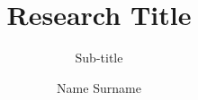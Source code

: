 \documentclass{cml-report}
\begin{document}
\frontmatter


\title{Research Title}

\subtitle{Sub-title}
\author{Name Surname}


\makecover







\tableofcontents


\mainmatter




\appendix

%


\end{document}
